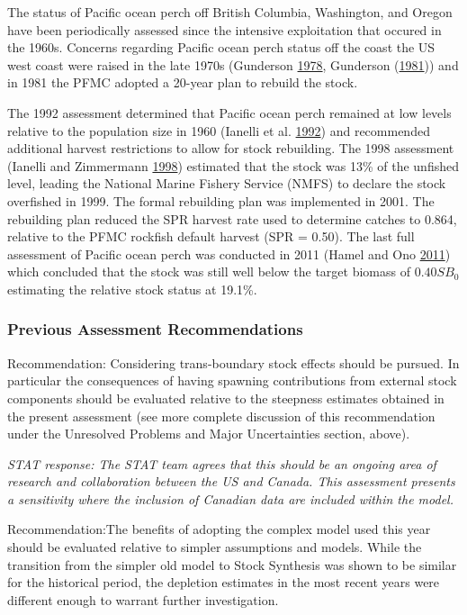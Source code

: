 \documentclass[12pt,]{article}
\begin{document}
The status of Pacific ocean perch off British Columbia, Washington, and
Oregon have been periodically assessed since the intensive exploitation
that occured in the 1960s. Concerns regarding Pacific ocean perch status
off the coast the US west coast were raised in the late 1970s (Gunderson
\protect\hyperlink{ref-gunderson_results_1978}{1978}, Gunderson
(\protect\hyperlink{ref-gunderson_updated_1981}{1981})) and in 1981 the
PFMC adopted a 20-year plan to rebuild the stock.

The 1992 assessment determined that Pacific ocean perch remained at low
levels relative to the population size in 1960 (Ianelli et al.
\protect\hyperlink{ref-ianelli_status_1992}{1992}) and recommended
additional harvest restrictions to allow for stock rebuilding. The 1998
assessment (Ianelli and Zimmermann
\protect\hyperlink{ref-ianelli_status_1998}{1998}) estimated that the
stock was 13\% of the unfished level, leading the National Marine
Fishery Service (NMFS) to declare the stock overfished in 1999. The
formal rebuilding plan was implemented in 2001. The rebuilding plan
reduced the SPR harvest rate used to determine catches to 0.864,
relative to the PFMC rockfish default harvest (SPR = 0.50). The last
full assessment of Pacific ocean perch was conducted in 2011 (Hamel and
Ono \protect\hyperlink{ref-hamel_stock_2011}{2011}) which concluded that
the stock was still well below the target biomass of \(0.40SB_{0}\)
estimating the relative stock status at 19.1\%.

\subsubsection{Previous Assessment
Recommendations}\label{previous-assessment-recommendations}

Recommendation: Considering trans-boundary stock effects should be
pursued. In particular the consequences of having spawning contributions
from external stock components should be evaluated relative to the
steepness estimates obtained in the present assessment (see more
complete discussion of this recommendation under the Unresolved Problems
and Major Uncertainties section, above).

\emph{STAT response: The STAT team agrees that this should be an ongoing
area of research and collaboration between the US and Canada. This
assessment presents a sensitivity where the inclusion of Canadian data
are included within the model.}

Recommendation:The benefits of adopting the complex model used this year
should be evaluated relative to simpler assumptions and models. While
the transition from the simpler old model to Stock Synthesis was shown
to be similar for the historical period, the depletion estimates in the
most recent years were different enough to warrant further
investigation.
\end{document}
